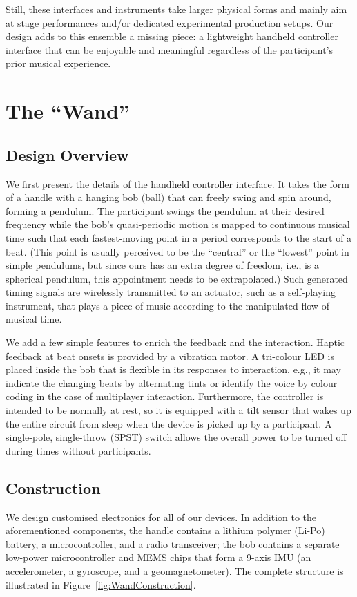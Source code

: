 \documentclass{nime-alternate} %
\begin{document}
Still, these interfaces and instruments take larger physical forms and mainly aim at stage performances and/or dedicated experimental production setups. Our design adds to this ensemble a missing piece: a lightweight handheld controller interface that can be enjoyable and meaningful regardless of the participant's prior musical experience.

\section{The ``Wand''}

\subsection{Design Overview}
We first present the details of the handheld controller interface. It takes the form of a handle with a hanging bob (ball) that can freely swing and spin around, forming a pendulum. The participant swings the pendulum at their desired frequency while the bob's quasi-periodic motion is mapped to continuous musical time such that each fastest-moving point in a period corresponds to the start of a beat. (This point is usually perceived to be the ``central'' or the ``lowest'' point in simple pendulums, but since ours has an extra degree of freedom, i.e., is a spherical pendulum, this appointment needs to be extrapolated.) Such generated timing signals are wirelessly transmitted to an actuator, such as a self-playing instrument, that plays a piece of music according to the manipulated flow of musical time.

We add a few simple features to enrich the feedback and the interaction. Haptic feedback at beat onsets is provided by a vibration motor. A tri-colour LED is placed inside the bob that is flexible in its responses to interaction, e.g., it may indicate the changing beats by alternating tints or identify the voice by colour coding in the case of multiplayer interaction. Furthermore, the controller is intended to be normally at rest, so it is equipped with a tilt sensor that wakes up the entire circuit from sleep when the device is picked up by a participant. A single-pole, single-throw (SPST) switch allows the overall power to be turned off during times without participants.

\subsection{Construction}
We design customised electronics for all of our devices. In addition to the aforementioned components, the handle contains a lithium polymer (Li-Po) battery, a microcontroller, and a radio transceiver; the bob contains a separate low-power microcontroller and MEMS chips that form a 9-axis IMU (an accelerometer, a gyroscope, and a geomagnetometer). The complete structure is illustrated in Figure~\ref{fig:WandConstruction}.
\end{document}
